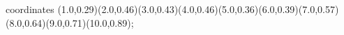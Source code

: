 					coordinates { (1.0,0.29)(2.0,0.46)(3.0,0.43)(4.0,0.46)(5.0,0.36)(6.0,0.39)(7.0,0.57)(8.0,0.64)(9.0,0.71)(10.0,0.89)};